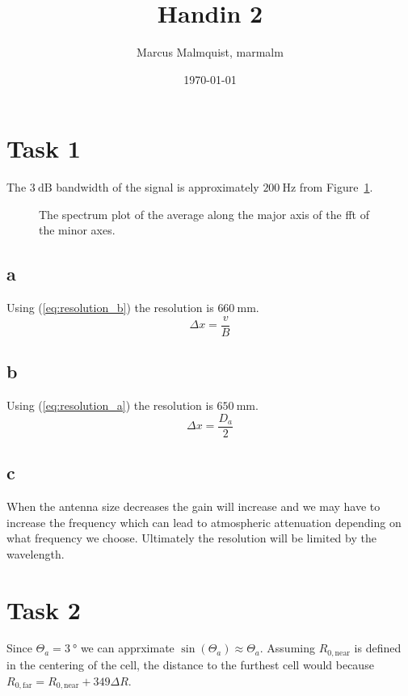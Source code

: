 \documentclass[12pt,a4paper]{article}
\title{Handin 2}
\author{Marcus Malmquist, marmalm}
\date{\today}
\begin{document}
\maketitle

\section{Task 1}\label{sec:1}
The $\SI{3}{\deci\bel}$ bandwidth of the signal is approximately $\SI{200}{\hertz}$ from Figure~\ref{fig:task1_ut}.
\begin{figure}[ht!]
  \centering
  \noindent\makebox[\textwidth]{\scalebox{0.90}{}}
  \caption{The spectrum plot of the average along the major axis of the fft of the minor axes.}
  \label{fig:task1_ut}
\end{figure}

\subsection{a}
Using (\ref{eq:resolution_b}) the resolution is $\SI{660}{\milli\metre}$.
\begin{equation}
  \label{eq:resolution_b}
  \Delta x = \frac{v}{B}
\end{equation}

\subsection{b}
Using (\ref{eq:resolution_a}) the resolution is $\SI{650}{\milli\metre}$.
\begin{equation}
  \label{eq:resolution_a}
  \Delta x = \frac{D_a}{2}
\end{equation}

\subsection{c}
When the antenna size decreases the gain will increase and we may have to increase the frequency which can lead to atmospheric attenuation depending on what frequency we choose.
Ultimately the resolution will be limited by the wavelength.

\section{Task 2}
Since $\Theta_a=\SI{3}{\degree}$ we can apprximate $\sin(\Theta_a)\approx\Theta_a$.
Assuming $R_{0,\text{near}}$ is defined in the centering of the cell, the distance to the furthest cell would because $R_{0,\text{far}}=R_{0,\text{near}}+349\Delta R$.
\end{document}
